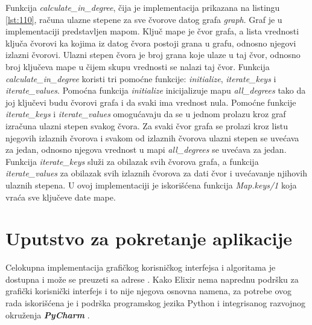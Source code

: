 \documentclass[12pt,oneside]{memoir}
\begin{document}
Funkcija \textit{calculate\_in\_degree}, čija je implementacija prikazana na listingu \ref{lst:110}, računa ulazne stepene za sve čvorove datog grafa \textit{graph}. Graf je u implementaciji predstavljen mapom. Ključ mape je čvor grafa, a lista vrednosti ključa čvorovi ka kojima iz datog
čvora postoji grana u grafu, odnosno njegovi izlazni čvorovi. Ulazni stepen čvora je broj grana koje ulaze u taj čvor, odnosno broj ključeva mape u čijem skupu vrednosti se nalazi taj čvor. Funkcija \textit{calculate\_in\_degree} koristi tri pomoćne funkcije: \textit{initialize}, \textit{iterate\_keys} i \textit{iterate\_values}. Pomoćna funkcija \textit{initialize} inicijalizuje mapu \textit{all\_degrees} tako da joj ključevi budu čvorovi grafa i da svaki ima vrednost nula. Pomoćne funkcije \textit{iterate\_keys} i \textit{iterate\_values} omogućavaju da se u jednom prolazu kroz graf izračuna ulazni stepen svakog čvora. Za svaki čvor grafa se prolazi kroz listu njegovih izlaznih čvorova i svakom od izlaznih čvorova ulazni stepen se uvećava za jedan, odnosno njegova vrednost u mapi \textit{all\_degrees} se uvećava za jedan. Funkcija \textit{iterate\_keys} služi za obilazak svih čvorova grafa, a funkcija \textit{iterate\_values} za obilazak svih izlaznih čvorova za dati čvor i uvećavanje njihovih ulaznih stepena. U ovoj implementaciji je iskorišćena funkcija \textit{Map.keys/1} koja vraća sve ključeve date mape.



\section{Uputstvo za pokretanje aplikacije}

Celokupna implementacija grafičkog korisničkog interfejsa i algoritama je dostupna i može se preuzeti sa adrese \cite{GIT}.
Kako Elixir nema naprednu podršku za grafički korisnički interfejs i to nije njegova osnovna namena, za potrebe ovog rada iskorišćena je i podrška programskog jezika Python i integrisanog razvojnog okruženja \textbf{\textit{PyCharm}} \cite{PyCharm}.
\end{document}
